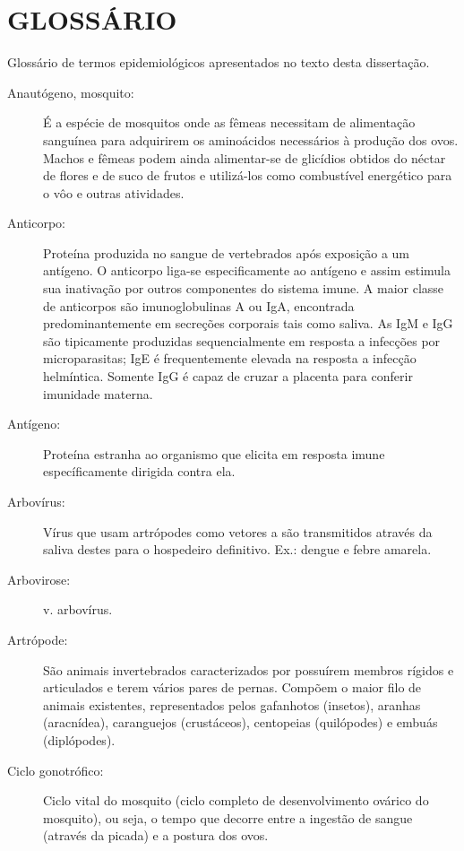 \section*{\centering GLOSSÁRIO}



Glossário de termos epidemiológicos apresentados no texto desta dissertação.

\begin{description}
\item[Anautógeno, mosquito:] É a espécie de mosquitos onde as fêmeas necessitam de alimentação sanguínea para adquirirem os aminoácidos necessários à produção dos ovos. Machos e fêmeas podem ainda alimentar-se de glicídios obtidos do néctar de flores e de suco de frutos e utilizá-los como combustível energético para o vôo e outras atividades.
\item[Anticorpo:] Proteína produzida no sangue de vertebrados após exposição a um antígeno. O anticorpo liga-se especificamente ao antígeno e assim estimula sua inativação por outros componentes do sistema imune. A maior classe de anticorpos são imunoglobulinas A ou IgA, encontrada predominantemente em secreções corporais tais como saliva. As IgM e IgG são tipicamente produzidas sequencialmente em resposta a infecções por microparasitas; IgE é frequentemente elevada na resposta a infecção helmíntica. Somente IgG é capaz de cruzar a placenta para conferir imunidade materna.
\item[Antígeno:] Proteína estranha ao organismo que elicita em resposta imune específicamente dirigida contra ela.

\item[Arbovírus:] Vírus que usam artrópodes como vetores a são transmitidos através da saliva destes para o hospedeiro definitivo. Ex.: dengue e febre amarela.

\item[Arbovirose:] v. arbovírus.

\item[Artrópode:] São animais invertebrados caracterizados por possuírem membros rígidos e articulados e terem vários pares de pernas. Compõem o maior filo de animais existentes, representados pelos gafanhotos (insetos), aranhas (aracnídea), caranguejos (crustáceos), centopeias (quilópodes) e embuás (diplópodes).

\item[Ciclo gonotrófico:] Ciclo vital do mosquito (ciclo completo de desenvolvimento ovárico do mosquito), ou seja, o tempo que decorre entre a ingestão de sangue (através da picada) e a postura dos ovos.


\end{description}
